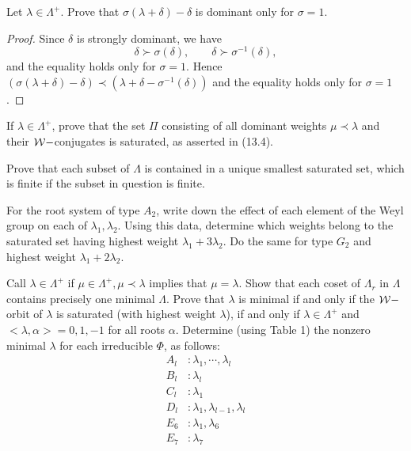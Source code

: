 \begin{ex}
  Let $\lambda\in \Lambda^{+}$. Prove that $\sigma(\lambda + \delta) - \delta$ is dominant only for $\sigma = 1$.
\end{ex}
\begin{proof}
	Since $\delta$ is strongly dominant, we have
	\[\delta\succ\sigma(\delta),\qquad\delta\succ\sigma^{-1}(\delta),\]
	and the equality holds only for $\sigma = 1$.
	Hence $(\sigma(\lambda + \delta) - \delta)\prec(\lambda + \delta - \sigma^{-1}(\delta))$ and the equality holds only for $\sigma = 1$.
\end{proof}

\begin{ex}
  If $\lambda\in \Lambda^{+}$, prove that the set $\Pi$ consisting of all dominant weights $\mu\prec\lambda$ and their ${\cal W}-$conjugates is saturated, as asserted in (13.4).
\end{ex}

\begin{ex}
  Prove that each subset of $\Lambda$ is contained in a unique smallest saturated set, which is finite if the subset in question is finite.
\end{ex}

\begin{ex}
  For the root system of type $A_2$, write down the effect of each element of the Weyl group on each of $\lambda_1, \lambda_2$. Using this data, determine which weights belong to the saturated set having highest weight $\lambda_1 + 3\lambda_2$. Do the same for type $G_2$ and highest weight $\lambda_1 + 2\lambda_2$.
\end{ex}

\begin{ex}
  Call $\lambda \in \Lambda^{+}$  if $\mu \in \Lambda^{+}, \mu\prec \lambda$ implies that $\mu = \lambda$. Show that each coset of $\Lambda_r$ in $\Lambda$ contains precisely one minimal $\Lambda$. Prove that $\lambda$ is minimal if and only if the ${\cal W}-$orbit of $\lambda$ is saturated (with highest weight $\lambda$), if and only if $\lambda \in \Lambda^{+}$ and $< \lambda, \alpha >= 0, 1, -1$ for all roots $\alpha$. Determine (using Table 1) the nonzero minimal $\lambda$ for each irreducible $\Phi$, as follows:
  \begin{align*}
    A_l &\colon\lambda_1, \cdots , \lambda_l \\
    B_l &\colon\lambda_l \\
    C_l &\colon\lambda_1 \\
    D_l &\colon\lambda_1, \lambda_{l-1}, \lambda_l \\
    E_6 &\colon\lambda_1, \lambda_6 \\
    E_7 &\colon\lambda_7
  \end{align*}
\end{ex}

